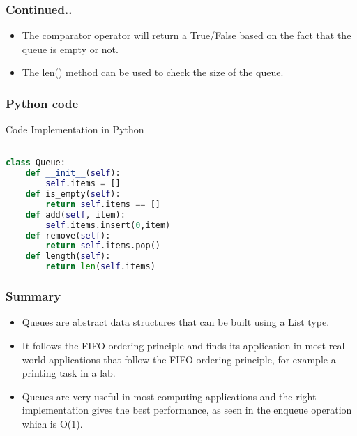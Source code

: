 \documentclass{beamer}
\begin{document}
\begin{frame}
\frametitle{Continued..}
\begin{itemize}



\item The comparator operator will return a True/False based on the fact that the queue is empty or not.

\item The len() method can be used to check the size of the queue.



\end{itemize}
\end{frame}

\begin{frame}[fragile]
\frametitle{Python code}

Code Implementation in Python
\begin{lstlisting}[language=Python]

class Queue:
	def __init__(self):
		self.items = []
	def is_empty(self):
		return self.items == []
	def add(self, item):
		self.items.insert(0,item)
	def remove(self):
		return self.items.pop()
	def length(self):
		return len(self.items)
\end{lstlisting}

\end{frame}

\begin{frame}
\frametitle{Summary}
\begin{itemize}
\item Queues are abstract data structures that can be built using a List type.
\item It follows the FIFO ordering principle and finds its application in most real world applications that follow the FIFO ordering principle, for example a printing task in a lab.
\item Queues are very useful in most computing applications and the right implementation gives the best performance, as seen in the enqueue operation which is O(1).
\end{itemize}
\end{frame}
\end{document}
